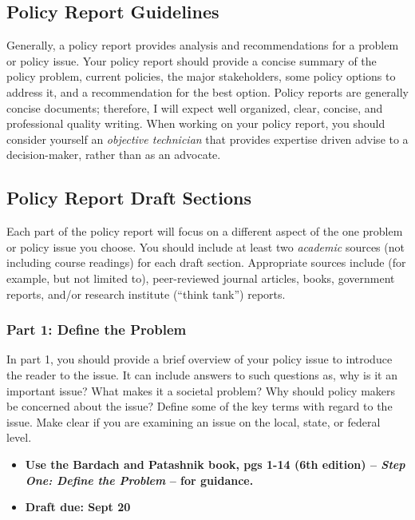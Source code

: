 \subsection{Policy Report Guidelines}\label{policy-report-guidelines}

Generally, a policy report provides analysis and recommendations for a
problem or policy issue. Your policy report should provide a concise
summary of the policy problem, current policies, the major stakeholders,
some policy options to address it, and a recommendation for the best
option. Policy reports are generally concise documents; therefore, I will expect
well organized, clear, concise, and professional quality writing.
When working on your policy report, you should consider yourself an \emph{objective technician} 
that provides expertise driven advise to a decision-maker, rather than as an advocate.

\hypertarget{paper-guidelines}{%
\subsection{Policy Report Draft Sections}\label{paper-guidelines}}

Each part of the policy report will focus on a different aspect of the one problem or
policy issue you choose. You should include at least two \emph{academic}
sources (not including course readings) for each draft section. Appropriate
sources include (for example, but not limited to), peer-reviewed journal
articles, books, government reports, and/or research institute (``think
tank'') reports.

\hypertarget{issue-paper-1-define-the-problem}{%
\subsubsection{Part 1: Define the
Problem}\label{part-1-define-the-problem}}

In part 1, you should provide a brief overview of your policy
issue to introduce the reader to the issue. It can include answers to
such questions as, why is it an important issue? What makes it a
societal problem? Why should policy makers be concerned about the issue?
Define some of the key terms with regard to the issue. Make clear if you
are examining an issue on the local, state, or federal level.

\begin{itemize}
\item \textbf{Use the Bardach and Patashnik book, pgs 1-14 (6th edition) -- \textit{Step One: Define the Problem} -- for guidance.}

\item \textbf{Draft due: Sept 20}
\end{itemize}

